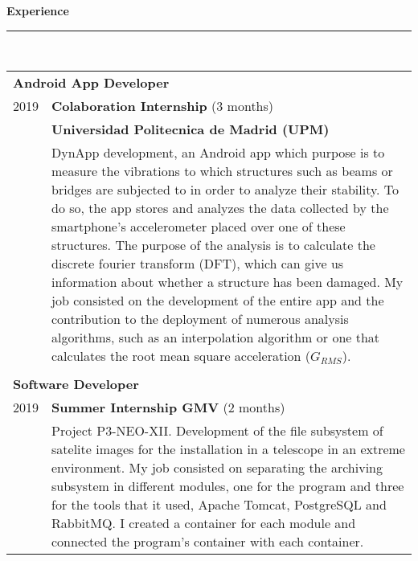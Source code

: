 \documentclass{article}
\begin{document}
\begin{minipage}[c]{0.66\linewidth}
  \setlength{\parskip}{0.3em}

  \textbf{\Large{\color{BlueViolet}Experience}}\\[-0.25cm]
  {\color{BlueViolet} \rule{\linewidth}{0.1mm} }\\[-0.05cm]
  \begin{tabular}{l l}
    \multicolumn{2}{p{6cm}}{\hspace{0.40cm} \textbf{Android App Developer}}\\[0.1cm]
    2019 & \textbf{Colaboration Internship} (3 months)\\
         & \textbf{Universidad Politecnica de Madrid (UPM)} \\
         & \multicolumn{1}{p{11cm}}{DynApp development, an Android app which purpose is to measure the vibrations to which structures such as beams or bridges are subjected to in order to analyze their stability. To do so, the app stores and analyzes the data collected by the smartphone's accelerometer placed over one of these structures. The purpose of the analysis is to calculate the discrete fourier transform (DFT), which can give us information about whether a structure has been damaged. My job consisted on the development of the entire app and the contribution to the deployment of numerous analysis algorithms, such as an interpolation algorithm or one that calculates the root mean square acceleration ($G_{RMS}$).}\\ \\[-0.1cm]
    \multicolumn{2}{p{6cm}}{\hspace{0.40cm} \textbf{Software Developer}}\\[0.1cm]
    2019 & \textbf{Summer Internship GMV} (2 months)\\
         & \multicolumn{1}{p{11cm}}{Project P3-NEO-XII. Development of the file subsystem of satelite images for the installation in a telescope in an extreme environment. My job consisted on separating the archiving subsystem in different modules, one for the program and three for the tools that it used, Apache Tomcat, PostgreSQL and RabbitMQ. I created a container for each module and connected the program's container with each container.} \\
  \end{tabular}
  \vspace{0.3cm}
  

\end{minipage}
\end{document}
